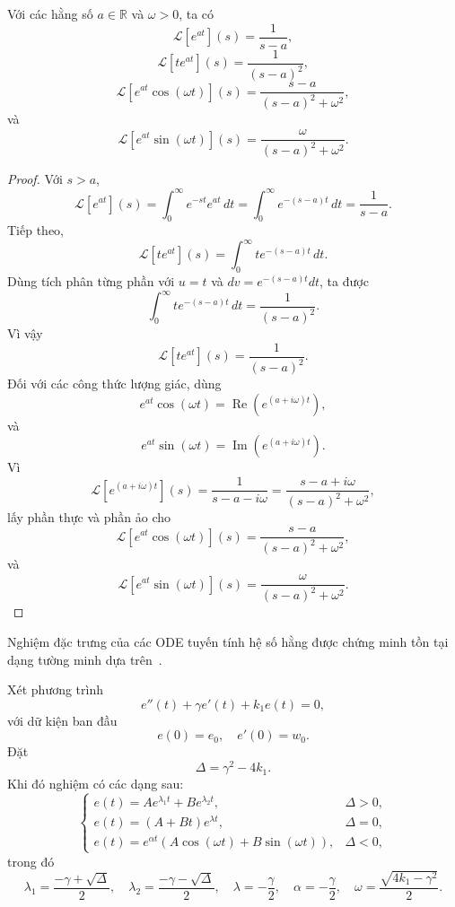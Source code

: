 ﻿\documentclass[12pt]{article}
\begin{document}
\begin{lemma}
Với các hằng số $a \in \mathbb R$ và $\omega > 0$, ta có
\[
 \mathcal L[e^{at}](s) = \frac{1}{s - a},
\]
\[
 \mathcal L[te^{at}](s) = \frac{1}{(s - a)^2},
\]
\[
 \mathcal L[e^{at}\cos(\omega t)](s)
 =
 \frac{s - a}{(s - a)^2 + \omega^2},
\]
và
\[
 \mathcal L[e^{at}\sin(\omega t)](s)
 =
 \frac{\omega}{(s - a)^2 + \omega^2}.
\]
\end{lemma}
\begin{proof}
Với $s > a$,
\[
 \mathcal L[e^{at}](s)
 = \int_0^\infty e^{-st}e^{at}\, dt
 = \int_0^\infty e^{-(s - a)t}\, dt
 =
 \frac{1}{s - a}.
\]
Tiếp theo,
\[
 \mathcal L[te^{at}](s)
 = \int_0^\infty t e^{-(s - a)t}\, dt.
\]
Dùng tích phân từng phần với $u = t$ và $dv = e^{-(s - a)t}dt$, ta được
\[ \int_0^\infty t e^{-(s - a)t}\, dt
 =
 \frac{1}{(s - a)^2}.
\]
Vì vậy
\[
 \mathcal L[te^{at}](s) = \frac{1}{(s - a)^2}.
\]
Đối với các công thức lượng giác, dùng
\[
 e^{at}\cos(\omega t) = \operatorname{Re}\left(e^{(a + i\omega)t}\right),
\]
và
\[
 e^{at}\sin(\omega t) = \operatorname{Im}\left(e^{(a + i\omega)t}\right).
\]
Vì
\[
 \mathcal L[e^{(a + i\omega)t}](s)
 =
 \frac{1}{s - a - i\omega}
 =
 \frac{s - a + i\omega}{(s - a)^2 + \omega^2},
\]
lấy phần thực và phần ảo cho
\[
 \mathcal L[e^{at}\cos(\omega t)](s)
 =
 \frac{s - a}{(s - a)^2 + \omega^2},
\]
và
\[
 \mathcal L[e^{at}\sin(\omega t)](s)
 =
 \frac{\omega}{(s - a)^2 + \omega^2}.
\]
\end{proof}
Nghiệm đặc trưng của các ODE tuyến tính hệ số hằng được chứng minh tồn tại dạng tường minh dựa trên~\cite{kelley_peterson_ode_2010}.
\begin{theorem}
Xét phương trình
\[
 e''(t) + \gamma e'(t) + k_1e(t) = 0,
\]
với dữ kiện ban đầu
\[
 e(0) = e_0,\quad e'(0) = w_0.
\]
Đặt
\[
 \Delta = \gamma^2 - 4k_1.
\]
Khi đó nghiệm có các dạng sau:
\[
\begin{cases}
 e(t) = Ae^{\lambda_1t} + Be^{\lambda_2t}, & \Delta > 0,\\[4pt]
 e(t) = (A + Bt)e^{\lambda t}, & \Delta = 0,\\[4pt]
 e(t) = e^{\alpha t}\left(A\cos(\omega t) + B\sin(\omega t)\right), & \Delta < 0,
\end{cases}
\]
trong đó
\[
 \lambda_1 = \frac{-\gamma + \sqrt{\Delta}}2,
 \quad
 \lambda_2 = \frac{-\gamma - \sqrt{\Delta}}2,
 \quad
 \lambda = -\frac{\gamma}{2},
 \quad
 \alpha = -\frac{\gamma}{2},
 \quad
 \omega = \frac{\sqrt{4k_1 - \gamma^2}}2.
\]
\end{theorem}
\end{document}
